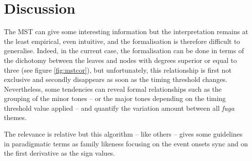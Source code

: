 \section{Discussion}

The MST can give some interesting information but the interpretation remains at the least empirical, even intuitive, and the formalisation is therefore difficult to generalise. Indeed, in the current case, the formalisation can be done in terms of the dichotomy between the leaves and nodes with degrees superior or equal to three (see figure \ref{fig:mstcor}), but unfortunately, this relationship is first not exclusive and secondly disappears as soon as the timing threshold changes. Nevertheless, some tendencies can reveal formal relationships such as the grouping of the minor tones -- or the major tones depending on the timing threshold value applied -- and quantify the variation amount between all \textit{fuga} themes.

\bigskip

The relevance is relative but this algorithm -- like others -- gives some guidelines in paradigmatic terms as family likeness focusing on the event onsets sync  and on the first derivative  as the sign values. 


